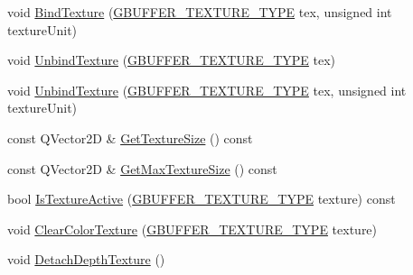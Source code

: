 \begin{DoxyCompactItemize}
\item 
void \mbox{\hyperlink{class_geometry_engine_1_1_geometry_buffer_1_1_g_buffer_a3142603e5ce9519da6d4aba1d07fec1f}{Bind\+Texture}} (\mbox{\hyperlink{class_geometry_engine_1_1_geometry_buffer_1_1_g_buffer_a718dceafcac1915f7de061108597e1cc}{G\+B\+U\+F\+F\+E\+R\+\_\+\+T\+E\+X\+T\+U\+R\+E\+\_\+\+T\+Y\+PE}} tex, unsigned int texture\+Unit)
\item 
void \mbox{\hyperlink{class_geometry_engine_1_1_geometry_buffer_1_1_g_buffer_a15ffb63e72295abb6a10b2481fb878e4}{Unbind\+Texture}} (\mbox{\hyperlink{class_geometry_engine_1_1_geometry_buffer_1_1_g_buffer_a718dceafcac1915f7de061108597e1cc}{G\+B\+U\+F\+F\+E\+R\+\_\+\+T\+E\+X\+T\+U\+R\+E\+\_\+\+T\+Y\+PE}} tex)
\item 
void \mbox{\hyperlink{class_geometry_engine_1_1_geometry_buffer_1_1_g_buffer_a0bbb50c4eabcee8677a3da316042c44e}{Unbind\+Texture}} (\mbox{\hyperlink{class_geometry_engine_1_1_geometry_buffer_1_1_g_buffer_a718dceafcac1915f7de061108597e1cc}{G\+B\+U\+F\+F\+E\+R\+\_\+\+T\+E\+X\+T\+U\+R\+E\+\_\+\+T\+Y\+PE}} tex, unsigned int texture\+Unit)
\item 
const Q\+Vector2D \& \mbox{\hyperlink{class_geometry_engine_1_1_geometry_buffer_1_1_g_buffer_a2b829115597fc587cd6f4ddb52b875cc}{Get\+Texture\+Size}} () const
\item 
const Q\+Vector2D \& \mbox{\hyperlink{class_geometry_engine_1_1_geometry_buffer_1_1_g_buffer_a47bda4849000d2728538de4e2f27f11a}{Get\+Max\+Texture\+Size}} () const
\item 
bool \mbox{\hyperlink{class_geometry_engine_1_1_geometry_buffer_1_1_g_buffer_a66ccde86e455532b2eac771163570f04}{Is\+Texture\+Active}} (\mbox{\hyperlink{class_geometry_engine_1_1_geometry_buffer_1_1_g_buffer_a718dceafcac1915f7de061108597e1cc}{G\+B\+U\+F\+F\+E\+R\+\_\+\+T\+E\+X\+T\+U\+R\+E\+\_\+\+T\+Y\+PE}} texture) const
\item 
void \mbox{\hyperlink{class_geometry_engine_1_1_geometry_buffer_1_1_g_buffer_abf39c85cb87eaf0475205b59333253c0}{Clear\+Color\+Texture}} (\mbox{\hyperlink{class_geometry_engine_1_1_geometry_buffer_1_1_g_buffer_a718dceafcac1915f7de061108597e1cc}{G\+B\+U\+F\+F\+E\+R\+\_\+\+T\+E\+X\+T\+U\+R\+E\+\_\+\+T\+Y\+PE}} texture)
\item 
\mbox{\label{class_geometry_engine_1_1_geometry_buffer_1_1_g_buffer_a95a83a79632226dd0cc8878af9c76f62}} 
void \mbox{\hyperlink{class_geometry_engine_1_1_geometry_buffer_1_1_g_buffer_a95a83a79632226dd0cc8878af9c76f62}{Detach\+Depth\+Texture}} ()

\end{DoxyCompactItemize}
